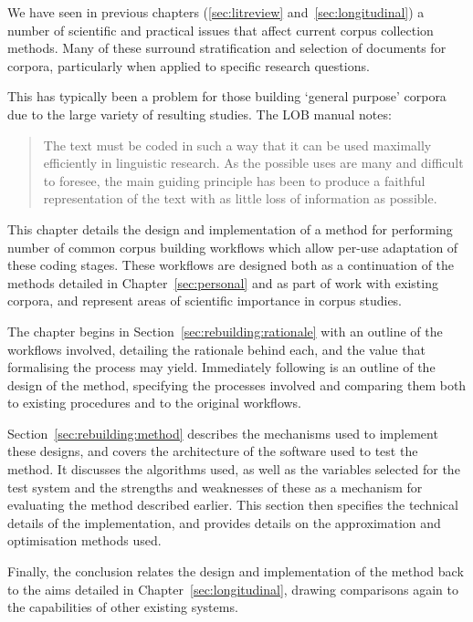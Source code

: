 

We have seen in previous chapters (\ref{sec:litreview} and~\ref{sec:longitudinal}) a number of scientific and practical issues that affect current corpus collection methods.  Many of these surround stratification and selection of documents for corpora, particularly when applied to specific research questions.

This has typically been a problem for those building `general purpose' corpora due to the large variety of resulting studies.  The LOB manual\cite{johansson1986tagged} notes:

\begin{quote}
The text must be coded in such a way that it can be used maximally efficiently in linguistic research. As the possible uses are many and difficult to foresee, the main guiding principle has been to produce a faithful representation of the text with as little loss of information as possible.
\end{quote}


This chapter details the design and implementation of a method for performing number of common corpus building workflows which allow per-use adaptation of these coding stages.  These workflows are designed both as a continuation of the methods detailed in Chapter~\ref{sec:personal} and as part of work with existing corpora, and represent areas of scientific importance in corpus studies.

The chapter begins in Section~\ref{sec:rebuilding:rationale} with an outline of the workflows involved, detailing the rationale behind each, and the value that formalising the process may yield.  Immediately following is an outline of the design of the method, specifying the processes involved and comparing them both to existing procedures and to the original workflows.

Section~\ref{sec:rebuilding:method} describes the mechanisms used to implement these designs, and covers the architecture of the software used to test the method.  It discusses the algorithms used, as well as the variables selected for the test system and the strengths and weaknesses of these as a mechanism for evaluating the method described earlier.  This section then specifies the technical details of the implementation, and provides details on the approximation and optimisation methods used.  

Finally, the conclusion relates the design and implementation of the method back to the aims detailed in Chapter~\ref{sec:longitudinal}, drawing comparisons again to the capabilities of other existing systems.

